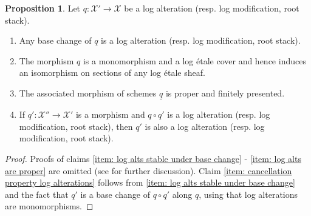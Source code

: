 \documentclass[11pt]{amsart}
\theoremstyle{definition}
\theoremstyle{definition}
\newtheorem{proposition}[theorem]{Proposition}
\newcommand{\cX}{\mathcal{X}}
\newcommand{\ul}[1]{\underline{#1}}
\newcommand{\cal}{\mathcal}
\def\cX{{\cal X}}
\begin{document}
\begin{proposition}\label{proposition: basic properties of log alterations}
    Let $q\colon \cX'\rightarrow \cX$ be a log alteration (resp. log modification, root stack).
    \begin{enumerate}
        \item\label{item: log alts stable under base change} Any base change of $q$ is a log alteration (resp. log modification, root stack).
        \item\label{item: log alts is a mono log et cover} The morphism $q$ is a monomorphism and a log \'etale cover and hence induces an isomorphism on sections of any log \'etale sheaf.
        \item\label{item: log alts are proper} The associated morphism of schemes $\ul{q}$ is proper and finitely presented.
        \item\label{item: cancellation property log alterations} If $q'\colon \cX''\rightarrow\cX'$ is a morphism and $q\circ q'$ is a log alteration (resp. log modification, root stack), then $q'$ is also a log alteration (resp. log modification, root stack).
    \end{enumerate}
\end{proposition}
\begin{proof}
    Proofs of claims \eqref{item: log alts stable under base change} - \eqref{item: log alts are proper} are omitted (see \cite{Parabolic-sheaves-on-logarithmic-schemes,MolchoWise} for further discussion). Claim \eqref{item: cancellation property log alterations} follows from \eqref{item: log alts stable under base change} and the fact that $q'$ is a base change of $q\circ q'$ along $q$, using that log alterations are monomorphisms.
\end{proof}
\end{document}
